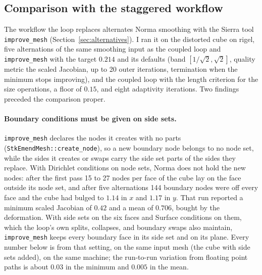 \documentclass[11pt]{article}
\newcommand{\code}[1]{\texttt{#1}}
\begin{document}
\subsection{Comparison with the staggered workflow}
\label{sec:staggered}

The workflow the loop replaces alternates Norma smoothing with the Sierra
tool \code{improve\_mesh} (Section~\ref{sec:alternatives}). I ran it on
the distorted cube on rigel, five alternations of the same smoothing
input as the coupled loop and \code{improve\_mesh} with the target
$0.214$ and its defaults (band $[1/\sqrt2, \sqrt2]$, quality metric the
scaled Jacobian, up to 20 outer iterations, termination when the minimum
stops improving), and the coupled loop with the length criterion for the
size operations, a floor of $0.15$, and eight adaptivity iterations. Two
findings preceded the comparison proper.

\paragraph{Boundary conditions must be given on side sets.}
\code{improve\_mesh} declares the nodes it creates with no parts
(\code{StkEmendMesh::create\_node}), so a new boundary node belongs to
no node set, while the sides it creates or swaps carry the side set parts
of the sides they replace. With Dirichlet conditions on node sets, Norma
does not hold the new nodes: after the first pass 15 to 27 nodes per face
of the cube lay on the face outside its node set, and after five
alternations 144 boundary nodes were off every face and the cube had
bulged to $1.14$ in $x$ and $1.17$ in $y$. That run reported a minimum
scaled Jacobian of $0.42$ and a mean of $0.706$, bought by the
deformation. With side sets on the six faces and Surface conditions on
them, which the loop's own splits, collapses, and boundary swaps also
maintain, \code{improve\_mesh} keeps every boundary face in its side set
and on its plane. Every number below is from that setting, on the same
input mesh (the cube with side sets added), on the same machine; the
run-to-run variation from floating point paths is about $0.03$ in the
minimum and $0.005$ in the mean.
\end{document}
